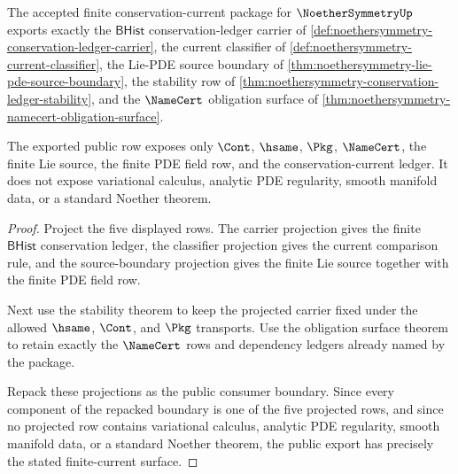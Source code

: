 \begin{theorem}
\label{thm:noethersymmetry-finite-current-public-export}
The accepted finite conservation-current package for $\NoetherSymmetryUp$
exports exactly the $\mathsf{BHist}$ conservation-ledger carrier of
\autoref{def:noethersymmetry-conservation-ledger-carrier}, the current
classifier of \autoref{def:noethersymmetry-current-classifier}, the
Lie-PDE source boundary of
\autoref{thm:noethersymmetry-lie-pde-source-boundary}, the stability row of
\autoref{thm:noethersymmetry-conservation-ledger-stability}, and the
$\NameCert$ obligation surface of
\autoref{thm:noethersymmetry-namecert-obligation-surface}.

The exported public row exposes only $\Cont$, $\hsame$, $\Pkg$,
$\NameCert$, the finite Lie source, the finite PDE field row, and the
conservation-current ledger. It does not expose variational calculus,
analytic PDE regularity, smooth manifold data, or a standard Noether
theorem.
\end{theorem}
\begin{proof}
Project the five displayed rows. The carrier projection gives the finite
$\mathsf{BHist}$ conservation ledger, the classifier projection gives the
current comparison rule, and the source-boundary projection gives the
finite Lie source together with the finite PDE field row.

Next use the stability theorem to keep the projected carrier fixed under
the allowed $\hsame$, $\Cont$, and $\Pkg$ transports. Use the obligation
surface theorem to retain exactly the $\NameCert$ rows and dependency
ledgers already named by the package.

Repack these projections as the public consumer boundary. Since every
component of the repacked boundary is one of the five projected rows, and
since no projected row contains variational calculus, analytic PDE
regularity, smooth manifold data, or a standard Noether theorem, the public
export has precisely the stated finite-current surface.
\end{proof}

